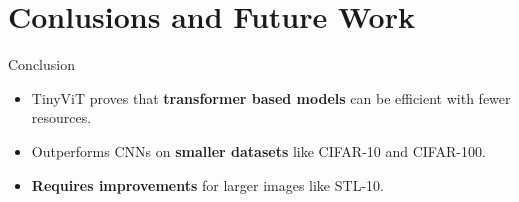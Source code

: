 \section{Conlusions and Future Work}

\begin{frame}{Conclusion}
  \begin{itemize}
    \item TinyViT proves that \textbf{transformer based models} can be efficient with fewer resources.
    \item Outperforms CNNs on \textbf{smaller datasets} like CIFAR-10 and CIFAR-100.
    \item \textbf{Requires improvements} for larger images like STL-10.
  \end{itemize}
\end{frame}

